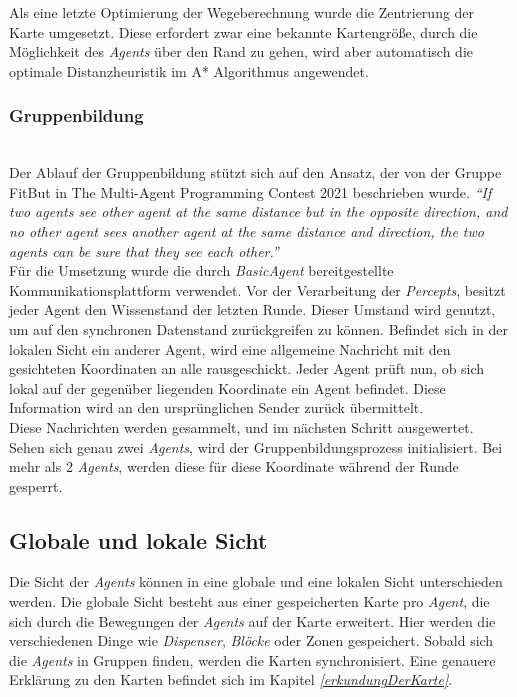 Als eine letzte Optimierung der Wegeberechnung wurde die Zentrierung der Karte umgesetzt. Diese erfordert zwar eine bekannte Kartengröße, durch die Möglichkeit des \textit{Agents} über den Rand zu gehen, wird aber automatisch die optimale Distanzheuristik im A* Algorithmus angewendet.



\subsubsection{Gruppenbildung} \label{kap:Gruppenbildung} ~\\
Der Ablauf der Gruppenbildung stützt sich auf den Ansatz, der von der Gruppe FitBut in \glqq{}The Multi-Agent Programming Contest 2021\grqq{} beschrieben wurde. \textit{ “If two agents see other agent at the same distance but in the opposite direction, and no other agent sees another agent at the same distance and direction, the two agents can be sure that they see each other.”}\cite{ref_book1}  \\

Für die Umsetzung wurde die durch \textit{BasicAgent}  bereitgestellte Kommunikationsplattform verwendet. Vor der Verarbeitung der \textit{Percepts}, besitzt jeder Agent den Wissenstand der letzten Runde. Dieser Umstand wird genutzt, um auf den synchronen Datenstand zurückgreifen zu können. Befindet sich in der lokalen Sicht ein anderer Agent, wird eine allgemeine Nachricht mit den gesichteten Koordinaten an alle rausgeschickt. Jeder Agent prüft nun, ob sich lokal auf der gegenüber liegenden Koordinate ein Agent befindet. Diese Information wird an den ursprünglichen Sender zurück übermittelt.  \\

Diese Nachrichten werden gesammelt, und im nächsten Schritt ausgewertet. Sehen sich genau zwei \textit{Agents}, wird der Gruppenbildungsprozess initialisiert. Bei mehr als 2 \textit{Agents}, werden diese für diese Koordinate während der Runde gesperrt. \\


\subsection{Globale und lokale Sicht} \label{kap:lokaleSicht}
Die Sicht der \textit{Agents} können in eine globale und eine lokalen Sicht unterschieden werden. Die globale Sicht besteht aus einer gespeicherten Karte pro \textit{Agent}, die sich durch die Bewegungen der \textit{Agents} auf der Karte erweitert. Hier werden die verschiedenen Dinge wie \textit{Dispenser}, \textit{Blöcke} oder Zonen gespeichert. Sobald sich die \textit{Agents} in Gruppen finden, werden die Karten synchronisiert. Eine genauere Erklärung zu den Karten befindet sich im Kapitel \textit{\ref{erkundungDerKarte}}.

